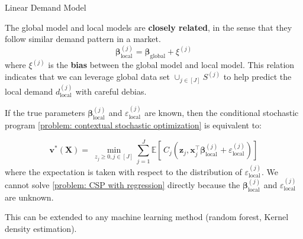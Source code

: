 \documentclass{beamer}
\newcommand{\mb}[1]{{\mathbf{#1}}}
\newcommand{\txrd}[1]{{\textcolor{sintefred}{\textbf{#1}}}}
\begin{document}
\begin{frame}{Linear Demand Model}

The global model and local models are \txrd{closely related}, in the sense that they follow similar demand pattern in a market.
{
\large
\[
{\bm \beta}^{(j)}_{\text{local}} =  {\bm \beta}_{\text{global}}  + \xi^{(j)}
\]
}
where $\xi^{(j)}$ is the \txrd{bias} between the global model and local model.  This relation indicates that we can leverage global data set $\cup_{j \in [J]} S^{(j)}$ to help predict the local demand $d_{\text{local}}^{(j)}$ with careful debias.

\vspace{0.3cm}

If the true parameters $ {\bm \beta}^{(j)}_{\text{local}}$ and ${\varepsilon}^{(j)}_{\text{local}}$ are known, then the conditional stochastic program \eqref{problem: contextual stochastic optimization} is equivalent to:

{
\large
\begin{equation}
\bm v^*({\mb X}) = \ 
\min_{ z_j \geq 0, j\in[J]}
 \sum_{j=1}^J 
\mathbb{E} \left[\,C_j \left( \bm z_j, \bm x_j^\top  {\bm \beta}^{(j)}_{\text{local}} + \varepsilon_{\text{local}}^{(j)} \right) \right]
\label{problem: CSP with regression}
\end{equation}
}
where the expectation is taken with respect to the distribution of $\varepsilon_{\text{local}}^{(j)}$. We cannot solve \eqref{problem: CSP with regression} directly because the $ {\bm \beta}^{(j)}_{\text{local}}$ and $\varepsilon_{\text{local}}^{(j)}$ are \alert{unknown}. 

\vspace{0.1 cm}

This can be extended to any machine learning method (random forest, Kernel density estimation).

\end{frame}


\end{document}
